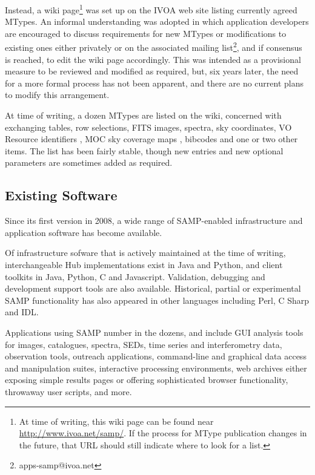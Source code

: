 \documentclass[5p]{elsarticle}
\begin{document}
Instead, a wiki page\footnote{
  At time of writing, this wiki page can be found near
  \mbox{\url{http://www.ivoa.net/samp/}}.
  If the process for MType publication changes in the future,
  that URL should still indicate where to look for a list.}
was set up on the IVOA web site listing currently agreed MTypes.
An informal understanding was adopted in which
application developers are encouraged to discuss requirements for
new MTypes or modifications to existing ones either privately or
on the associated mailing list\footnote{apps-samp@ivoa.net}, 
and if consensus is reached, to edit the wiki page accordingly.
This was intended as a provisional measure to be reviewed and
modified as required, but, six years later, the need for a more
formal process has not been apparent, and there are no current
plans to modify this arrangement.

At time of writing, a dozen MTypes are listed on the wiki,
concerned with exchanging tables, row selections, FITS images, spectra,
sky coordinates, VO Resource identifiers \citep{ACVOregistry},
MOC sky coverage maps \citep{moc_std},
bibcodes and one or two other items.
The list has been fairly stable, though new entries and new
optional parameters are sometimes added as required.

\subsection{Existing Software} \label{sec:software}

Since its first version in 2008, a wide range of SAMP-enabled
infrastructure and application software has become available.

Of infrastructure sofware that is actively maintained at the time of writing,
interchangeable Hub implementations exist in Java and Python,
and client toolkits in Java, Python, C and Javascript.
Validation, debugging and development support tools are also available.
Historical, partial or experimental SAMP functionality has
also appeared in other languages including Perl, C Sharp and IDL.

Applications using SAMP number in the dozens, and include
GUI analysis tools for images, catalogues, spectra, SEDs,
time series and interferometry data,
observation tools,
outreach applications,
command-line and graphical data access and manipulation suites,
interactive processing environments,
web archives either exposing simple results pages
or offering sophisticated browser functionality,
throwaway user scripts,
and more.
\end{document}

